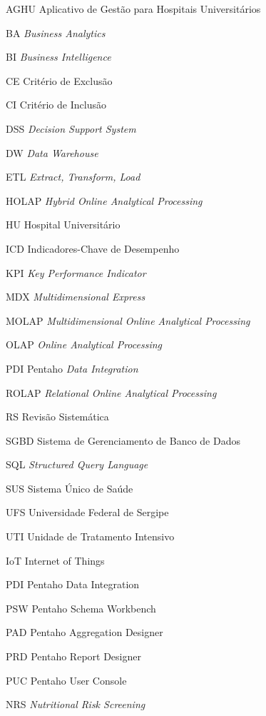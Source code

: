 
\begin{siglas}
\item[AGHU]{Aplicativo de Gestão para Hospitais Universitários}
\item[BA]{\textit{Business Analytics}}
\item[BI]{\textit{Business Intelligence}}
\item[CE]{Critério de Exclusão}
\item[CI]{Critério de Inclusão}
\item[DSS]{\textit{Decision Support System}}
\item[DW]{\textit{Data Warehouse}}
\item[ETL]{\textit{Extract, Transform, Load}}
\item[HOLAP]{\textit{Hybrid Online Analytical Processing}}
\item[HU]{Hospital Universitário}
\item[ICD]{Indicadores-Chave de Desempenho}
\item[KPI]{\textit{Key Performance Indicator}}
\item[MDX]{\textit{Multidimensional Express}}
\item[MOLAP]{\textit{Multidimensional Online Analytical Processing}}
\item[OLAP]{\textit{Online Analytical Processing}}
\item[PDI]{Pentaho \textit{Data Integration}}
\item[ROLAP]{\textit{Relational Online Analytical Processing}}
\item[RS]{Revisão Sistemática}
\item[SGBD]{Sistema de Gerenciamento de Banco de Dados}
\item[SQL]{\textit{Structured Query Language}}
\item[SUS]{Sistema Único de Saúde}
\item[UFS]{Universidade Federal de Sergipe}
\item[UTI]{Unidade de Tratamento Intensivo}
\item[IoT]{Internet of Things}
\item[PDI]{Pentaho Data Integration}
\item[PSW]{Pentaho Schema Workbench}
\item[PAD]{Pentaho Aggregation Designer}
\item[PRD]{Pentaho Report Designer}
\item[PUC]{Pentaho User Console}
\item[NRS]{\textit{Nutritional Risk Screening}}

\end{siglas}
